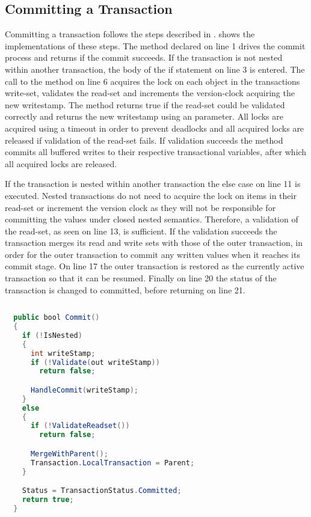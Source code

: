 \subsection{Committing a Transaction}
Committing a transaction follows the steps described in .  shows the implementations of these steps. The  method declared on line 1 drives the commit process and returns  if the commit succeeds. If the transaction is not nested within another transaction, the body of the if statement on line 3 is entered. The call to the  method on line 6 acquires the lock on each object in the transactions write-set, validates the read-set and increments the version-clock acquiring the new writestamp. The  method returns true if the read-set could be validated correctly and returns the new writestamp using an  parameter. All locks are acquired using a timeout in order to prevent deadlocks and all acquired locks are released if validation of the read-set fails. If validation succeeds the  method commits all buffered writes to their respective transactional variables, after which all acquired locks are released. 

If the transaction is nested within another transaction the else case on line 11 is executed. Nested transactions do not need to acquire the lock on items in their read-set or increment the version clock as they will not be responsible for committing the values under closed nested semantics. Therefore, a validation of the read-set, as seen on line 13, is sufficient. If the validation succeeds the transaction merges its read and write sets with those of the outer transaction, in order for the outer transaction to commit any written values when it reaches its commit stage. On line 17 the outer transaction is restored as the currently active transaction so that it can be resumed. Finally on line 20 the status of the transaction is changed to committed, before returning on line 21.


\begin{lstlisting}[label=lst:library_commit,
  caption={Committing a Transaction},
  language=Java,  
  showspaces=false,
  showtabs=false,
  breaklines=true,
  showstringspaces=false,
  breakatwhitespace=true,
  commentstyle=\color{greencomments},
  keywordstyle=\color{bluekeywords},
  stringstyle=\color{redstrings},
  morekeywords={atomic, retry, orElse, var, get, set, bool}]  % Start your code-block
  
  public bool Commit()
  {
    if (!IsNested)
    {
      int writeStamp;
      if (!Validate(out writeStamp))
        return false;

      HandleCommit(writeStamp);
    }
    else
    {
      if (!ValidateReadset())
        return false;

      MergeWithParent();
      Transaction.LocalTransaction = Parent;
    }

    Status = TransactionStatus.Committed;
    return true;
  }
\end{lstlisting}
